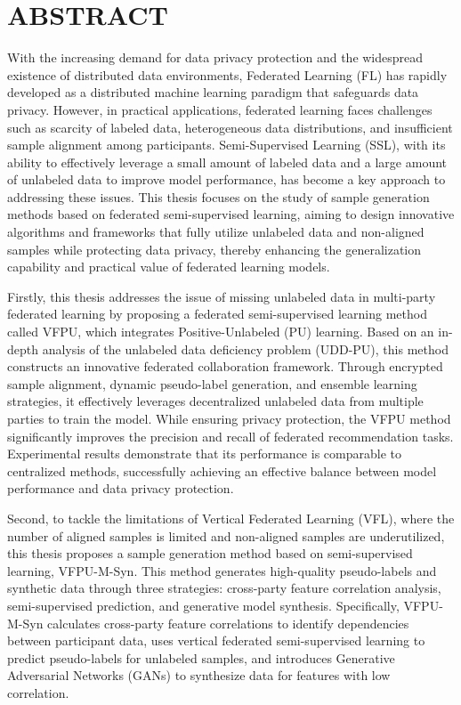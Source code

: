 



\chapter{ABSTRACT}
\xiaosi

With the increasing demand for data privacy protection and the widespread existence of distributed data environments, Federated Learning (FL) has rapidly developed as a distributed machine learning paradigm that safeguards data privacy. However, in practical applications, federated learning faces challenges such as scarcity of labeled data, heterogeneous data distributions, and insufficient sample alignment among participants. Semi-Supervised Learning (SSL), with its ability to effectively leverage a small amount of labeled data and a large amount of unlabeled data to improve model performance, has become a key approach to addressing these issues. This thesis focuses on the study of sample generation methods based on federated semi-supervised learning, aiming to design innovative algorithms and frameworks that fully utilize unlabeled data and non-aligned samples while protecting data privacy, thereby enhancing the generalization capability and practical value of federated learning models.

Firstly, this thesis addresses the issue of missing unlabeled data in multi-party federated learning by proposing a federated semi-supervised learning method called VFPU, which integrates Positive-Unlabeled (PU) learning. Based on an in-depth analysis of the unlabeled data deficiency problem (UDD-PU), this method constructs an innovative federated collaboration framework. Through encrypted sample alignment, dynamic pseudo-label generation, and ensemble learning strategies, it effectively leverages decentralized unlabeled data from multiple parties to train the model. While ensuring privacy protection, the VFPU method significantly improves the precision and recall of federated recommendation tasks. Experimental results demonstrate that its performance is comparable to centralized methods, successfully achieving an effective balance between model performance and data privacy protection.

Second, to tackle the limitations of Vertical Federated Learning (VFL), where the number of aligned samples is limited and non-aligned samples are underutilized, this thesis proposes a sample generation method based on semi-supervised learning, VFPU-M-Syn. This method generates high-quality pseudo-labels and synthetic data through three strategies: cross-party feature correlation analysis, semi-supervised prediction, and generative model synthesis. Specifically, VFPU-M-Syn calculates cross-party feature correlations to identify dependencies between participant data, uses vertical federated semi-supervised learning to predict pseudo-labels for unlabeled samples, and introduces Generative Adversarial Networks (GANs) to synthesize data for features with low correlation.

